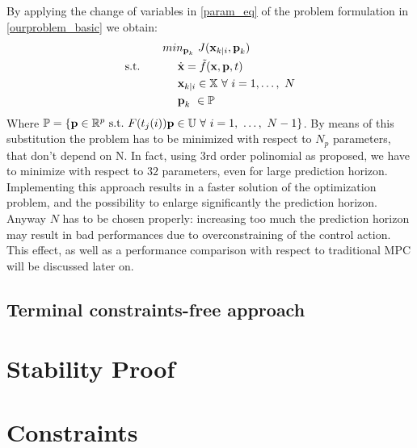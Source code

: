 By applying the change of variables in \ref{param_eq} of the problem formulation in \ref{ourproblem_basic} we obtain: 
\begin{equation} \label{ourproblem_basic}
\begin{split}
		& min_{\textbf{p}_k}\ J(\textbf{x}_{k|i},\textbf{p}_k) \\
		\textnormal{s.t.}\qquad
		&\ \ \ \ \dot{\textbf{x}}=\tilde{f}(\textbf{x},\textbf{p},t) \\
		&\ \ \ \ \textbf{x}_{k|i} \in \mathbb{X}\ \forall\ i=1,\dots,\ N  \\
		&\ \ \ \ \textbf{p}_k\   \in \mathbb{P}\ \\
	\end{split}	
\end{equation}
Where $\mathbb{P} = \lbrace \textbf{p}\in \mathbb{R}^p\ \textnormal{s.t.}\ F(t_j(i))\textbf{p} \in \mathbb{U}\ \forall\ i = 1,\ \dots,\ N-1 \rbrace $. By means of this substitution the problem has to be minimized with respect to $N_p$ parameters, that don't depend on N. In fact, using 3rd order polinomial as proposed, we have to minimize with respect to $32$ parameters, even for large prediction horizon. Implementing this approach results in a faster solution of the optimization problem, and the possibility to enlarge significantly the prediction horizon. Anyway $N$ has to be chosen properly: increasing too much the prediction horizon may result in bad performances due to overconstraining of the control action. This effect, as well as a performance comparison with respect to traditional MPC will be discussed later on.

\subsection{Terminal constraints-free approach}

\section{Stability Proof}\label{stabproof}

\section{Constraints}

